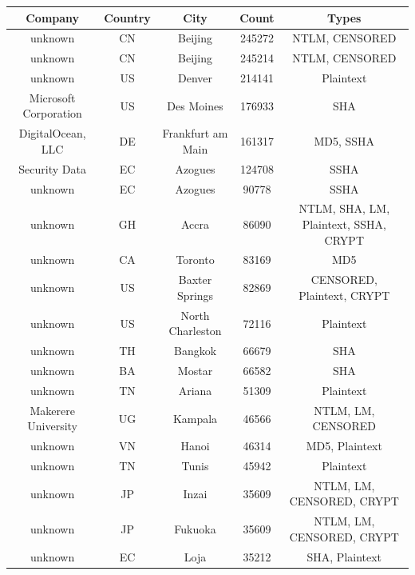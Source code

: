 \begin{table}[!ht]
\centering
\begin{tabular}{|c|c|c|c|c|}
 \hline
 \textbf{Company} & \textbf{Country} & \textbf{City} & \textbf{Count} & \textbf{Types}\\ 
 \hline
 \hline
 unknown & CN & Beijing & 245272 & NTLM, CENSORED \\
 \hline
 unknown & CN & Beijing & 245214 & NTLM, CENSORED \\
 \hline
 unknown & US & Denver & 214141 & Plaintext \\
 \hline
 Microsoft Corporation & US & Des Moines & 176933 & SHA \\
 \hline
 DigitalOcean, LLC & DE & Frankfurt am Main & 161317 & MD5, SSHA \\
 \hline
 Security Data & EC & Azogues & 124708 & SSHA \\
 \hline
 unknown & EC & Azogues & 90778 & SSHA \\
 \hline
 unknown & GH & Accra & 86090 & NTLM, SHA, LM, Plaintext, SSHA, CRYPT \\
 \hline
 unknown & CA & Toronto & 83169 & MD5 \\
 \hline
 unknown & US & Baxter Springs & 82869 & CENSORED, Plaintext, CRYPT \\
 \hline
 unknown & US & North Charleston & 72116 & Plaintext \\
 \hline
 unknown & TH & Bangkok & 66679 & SHA \\
 \hline
 unknown & BA & Mostar & 66582 & SHA \\
 \hline
 unknown & TN & Ariana & 51309 & Plaintext \\
 \hline
 Makerere University & UG & Kampala & 46566 & NTLM, LM, CENSORED \\
 \hline
 unknown & VN & Hanoi & 46314 & MD5, Plaintext \\
 \hline
 unknown & TN & Tunis & 45942 & Plaintext \\
 \hline
 unknown & JP & Inzai & 35609 & NTLM, LM, CENSORED, CRYPT \\
 \hline
 unknown & JP & Fukuoka & 35609 & NTLM, LM, CENSORED, CRYPT \\
 \hline
 unknown & EC & Loja & 35212 & SHA, Plaintext \\
 \hline
\end{tabular}
\end{table}

